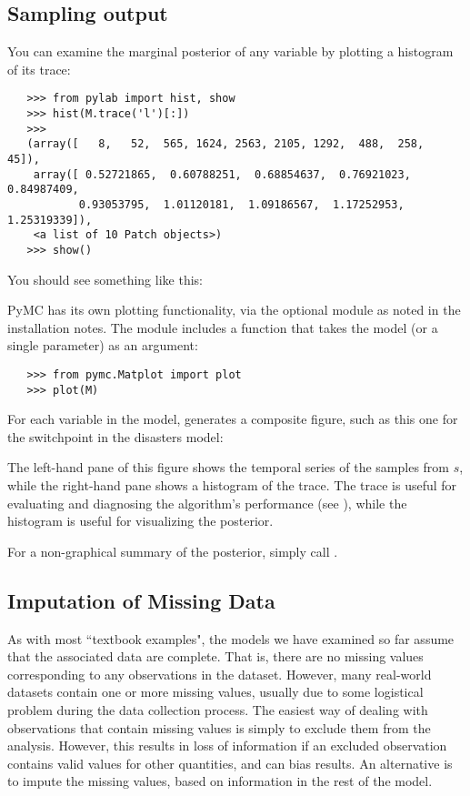 \subsection{Sampling output}
You can examine the marginal posterior of any variable by plotting a histogram of its trace:
\begin{verbatim}
   >>> from pylab import hist, show
   >>> hist(M.trace('l')[:])
   >>>
   (array([   8,   52,  565, 1624, 2563, 2105, 1292,  488,  258,   45]),
    array([ 0.52721865,  0.60788251,  0.68854637,  0.76921023,  0.84987409,
           0.93053795,  1.01120181,  1.09186567,  1.17252953,  1.25319339]),
    <a list of 10 Patch objects>)
   >>> show()
\end{verbatim}
You should see something like this:
\begin{center}
\end{center}
PyMC has its own plotting functionality, via the optional
 module as noted in the installation notes. The
 module includes a  function that takes the
model (or a single parameter) as an argument:
\begin{verbatim}
   >>> from pymc.Matplot import plot
   >>> plot(M)
\end{verbatim}
For each variable in the model,  generates a composite figure, such as this one for the switchpoint in the disasters model:
\begin{center}
\end{center}
The left-hand pane of this figure shows the temporal series of the samples from $s$, while the right-hand pane shows a histogram of the trace. The trace is useful for evaluating and diagnosing the algorithm's performance (see \cite*{gelman}), while the histogram is useful for visualizing the posterior.

For a non-graphical summary of the posterior, simply call .

\hypertarget{missing}{}
\subsection{Imputation of Missing Data} %

As with most ``textbook examples", the models we have examined so far assume that the associated data are complete. That is, there are no missing values corresponding to any observations in the dataset. However, many real-world datasets contain one or more missing values, usually due to some logistical problem during the data collection process. The easiest way of dealing with observations that contain missing values is simply to exclude them from the analysis. However, this results in loss of information if an excluded observation contains valid values for other quantities, and can bias results. An alternative is to impute the missing values, based on information in the rest of the model.

